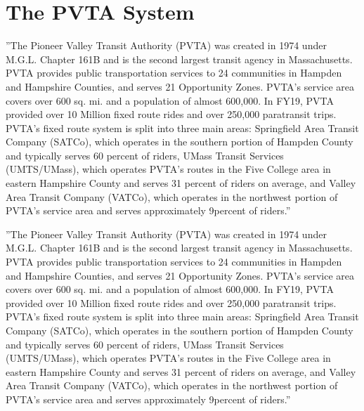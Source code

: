 \documentclass[11pt,twoside]{article}
\numberwithin{equation}{section}
\newcommand{\?}{\stackrel{?}{=}}
\begin{document}

\section{The PVTA System}

''The Pioneer Valley Transit Authority (PVTA) was created in 1974 under M.G.L. Chapter 161B and is the second largest transit agency in Massachusetts. PVTA provides public transportation services to 24 communities in Hampden and Hampshire Counties, and serves 21 Opportunity Zones. PVTA's service area covers over 600 sq. mi. and a population of almost 600,000. In FY19, PVTA provided over 10 Million fixed route rides and over 250,000 paratransit trips. PVTA’s fixed route system is split into three main areas: Springfield Area Transit Company (SATCo), which operates in the southern portion of Hampden County and typically serves 60 percent of riders, UMass Transit Services (UMTS/UMass), which operates PVTA's routes in the Five College area in eastern Hampshire County and serves 31 percent of riders on average, and Valley Area Transit Company (VATCo), which operates in the northwest portion of PVTA's service area and serves approximately 9percent of riders.''


''The Pioneer Valley Transit Authority (PVTA) was created in 1974 under M.G.L. Chapter 161B and is the second largest transit agency in Massachusetts. PVTA provides public transportation services to 24 communities in Hampden and Hampshire Counties, and serves 21 Opportunity Zones. PVTA's service area covers over 600 sq. mi. and a population of almost 600,000. In FY19, PVTA provided over 10 Million fixed route rides and over 250,000 paratransit trips. PVTA’s fixed route system is split into three main areas: Springfield Area Transit Company (SATCo), which operates in the southern portion of Hampden County and typically serves 60 percent of riders, UMass Transit Services (UMTS/UMass), which operates PVTA's routes in the Five College area in eastern Hampshire County and serves 31 percent of riders on average, and Valley Area Transit Company (VATCo), which operates in the northwest portion of PVTA's service area and serves approximately 9percent of riders.''
\end{document}
